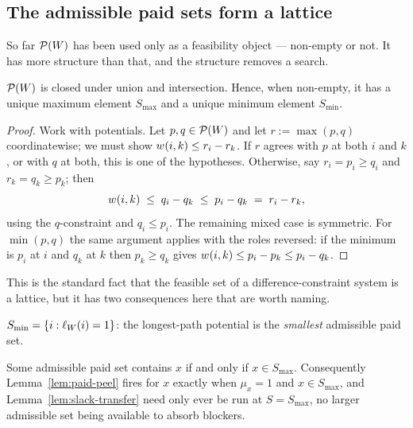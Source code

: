 \subsection{The admissible paid sets form a lattice}
\label{sec:paidsets-lattice}

So far $\mathcal{P}(W)$ has been used only as a feasibility object ---
non-empty or not. It has more structure than that, and the structure removes a
search.

\begin{theorem}[Lattice]
\label{thm:paidsets-lattice}
$\mathcal{P}(W)$ is closed under union and intersection. Hence, when
non-empty, it has a unique maximum element $S_{\max}$ and a unique minimum
element $S_{\min}$.
\end{theorem}

\begin{proof}
Work with potentials. Let $p, q \in \mathcal{P}(W)$ and let
$r := \max(p,q)$ coordinatewise; we must show $w_{}(i,k) \le r_i - r_k$. If
$r$ agrees with $p$ at both $i$ and $k$, or with $q$ at both, this is one of the
hypotheses. Otherwise, say $r_i = p_i \ge q_i$ and $r_k = q_k \ge p_k$; then
\[
  w_{}(i,k) \;\le\; q_i - q_k \;\le\; p_i - q_k \;=\; r_i - r_k ,
\]
using the $q$-constraint and $q_i \le p_i$. The remaining mixed case is
symmetric. For $\min(p,q)$ the same argument applies with the roles reversed:
if the minimum is $p_i$ at $i$ and $q_k$ at $k$ then $p_k \ge q_k$ gives
$w_{}(i,k) \le p_i - p_k \le p_i - q_k$.
\end{proof}

This is the standard fact that the feasible set of a difference-constraint system
is a lattice, but it has two consequences here that are worth naming.

\begin{corollary}
\label{cor:smin-is-ell}
$S_{\min} = \left\{i : \ell_{W}(i) = 1\right\}$: the longest-path potential is
the \emph{smallest} admissible paid set.
\end{corollary}

\begin{corollary}
\label{cor:smax-canonical}
Some admissible paid set contains $x$ if and only if $x \in S_{\max}$.
Consequently Lemma~\ref{lem:paid-peel} fires for $x$ exactly when $\mu_x = 1$ and
$x \in S_{\max}$, and Lemma~\ref{lem:slack-transfer} need only ever be run at
$S = S_{\max}$, no larger admissible set being available to absorb blockers.
\end{corollary}

